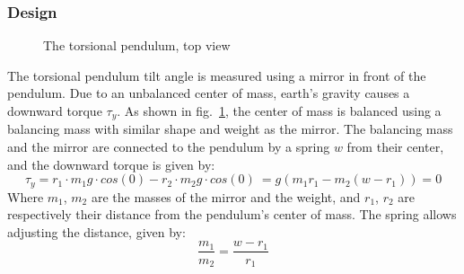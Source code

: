 \documentclass[\main/master.tex]{subfiles}
\begin{document}
\subsubsection{Design}
\begin{figure}[htbp]
	\centering
	\caption[The torsional pendulum, top view]{The torsional pendulum, top view}
	\label{fig:pendulum top}
\end{figure}
\FloatBarrier 
\par\noindent
The torsional pendulum tilt angle is measured using a mirror in front of the pendulum. Due to an unbalanced center of mass, earth's gravity causes a downward torque $\tau_y$. As shown in fig.~\ref{fig:pendulum top}, the center of mass is balanced using a balancing mass with similar shape and weight as the mirror. The balancing mass and the mirror are connected to the pendulum by a spring $w$ from their center, and the downward torque is given by:
\begin{equation}
\tau_y = r_1\cdot m_1 g \cdot cos(0) - r_2\cdot m_2 g \cdot cos (0)\ = g( m_1 r_1  - m_2 (w-r_1) )  =0    \label{eqn:downward torque}
\end{equation}
Where $m_1$, $m_2$ are the masses of the mirror and the weight, and $r_1$, $r_2$ are respectively their distance from the pendulum's center of mass. The spring allows adjusting the distance, given by: 
\begin{equation}
\frac{m_1}{m_2} = \frac{w-r_1}{r_1}   \label{eqn:downward torque cancelled}
\end{equation}
\end{document}
